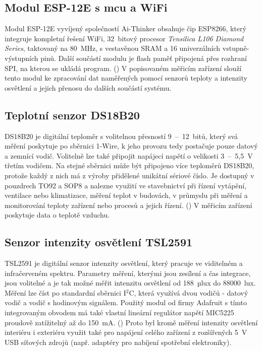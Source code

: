     \subsection{Modul ESP-12E s \acrshort{mcu} a WiFi}
        Modul ESP-12E vyvíjený společností Ai-Thinker obsahuje čip ESP8266, který integruje kompletní řešení WiFi, 32~bitový procesor \emph{Tensilica L106 Diamond Series}, taktovaný na 80~MHz, s vestavěnou SRAM a 16 univerzálních vstupně-výstupních pinů. Další součástí modulu je flash paměť připojená přes rozhraní SPI, na kterou se ukládá program. (\cite{ai-thinker:esp12e}) V popisovaném měřicím zařízení slouží tento modul ke zpracování dat naměřených pomocí senzorů teploty a intenzity osvětlení a jejich přenosu do dalších součástí systému.
    \subsection{Teplotní senzor DS18B20}
        DS18B20 je digitální teploměr s volitelnou přesností 9~--~12~bitů, který svá měření poskytuje po sběrnici 1-Wire, k jeho provozu tedy postačuje pouze datový a zemnící vodič. Volitelně lze také připojit napájecí napětí o velikosti 3~--~5{,}5~V třetím vodičem. Na stejné sběrnici může být připojeno více teploměrů DS18B20, protože každý z nich má z výroby přidělené unikátní sériové číslo. Je dostupný v pouzdrech TO92 a SOP8 a nalezne využití ve stavebnictví při řízení vytápění, ventilace nebo klimatizace, měření teplot v budovách, v průmyslu při měření a monitorování teploty zařízení nebo procesů a jejich řízení. (\cite{dallas:ds18b20}) V měřicím zařízení poskytuje data o teplotě vzduchu.
    \subsection{Senzor intenzity osvětlení TSL2591}
        TSL2591 je digitální senzor intenzity osvětlení, který pracuje ve viditelném a infračerveném spektru. Parametry měření, kterými jsou zesílení a čas integrace, jsou volitelné a je tak možné měřit intenzitu osvětlení od 188~µlux do $88000$~lux. Měření lze číst po standardní sběrnici I$^2$C, která využívá dvou vodičů - datový vodič a vodič s hodinovým signálem. Použitý modul od firmy Adafruit s tímto integrovaným obvodem má také vlastní lineární regulátor napětí MIC5225 proudově zatížitelný až do 150~mA. (\cite{adafruit:tsl2591}) Proto byl kromě měření intenzity osvětlení interiéru i exteriéru využit také pro napájení celého zařízení z rozšířených 5~V USB síťových zdrojů (např. adaptéry pro nabíjení spotřební elektroniky).
